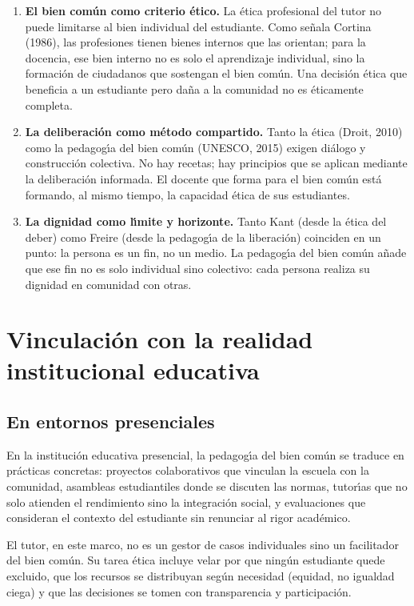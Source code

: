 \documentclass[12pt,letterpaper]{article}
\begin{document}
\begin{enumerate}
  \item \textbf{El bien com\'un como criterio \'etico.} La \'etica profesional del tutor no puede limitarse al bien individual del estudiante. Como se\~nala Cortina (1986), las profesiones tienen bienes internos que las orientan; para la docencia, ese bien interno no es solo el aprendizaje individual, sino la formaci\'on de ciudadanos que sostengan el bien com\'un. Una decisi\'on \'etica que beneficia a un estudiante pero da\~na a la comunidad no es \'eticamente completa.
  \item \textbf{La deliberaci\'on como m\'etodo compartido.} Tanto la \'etica (Droit, 2010) como la pedagog\'{\i}a del bien com\'un (UNESCO, 2015) exigen di\'alogo y construcci\'on colectiva. No hay recetas; hay principios que se aplican mediante la deliberaci\'on informada. El docente que forma para el bien com\'un est\'a formando, al mismo tiempo, la capacidad \'etica de sus estudiantes.
  \item \textbf{La dignidad como l\'{\i}mite y horizonte.} Tanto Kant (desde la \'etica del deber) como Freire (desde la pedagog\'{\i}a de la liberaci\'on) coinciden en un punto: la persona es un fin, no un medio. La pedagog\'{\i}a del bien com\'un a\~nade que ese fin no es solo individual sino colectivo: cada persona realiza su dignidad en comunidad con otras.
\end{enumerate}

\section{Vinculaci\'on con la realidad institucional educativa}

\subsection{En entornos presenciales}

En la instituci\'on educativa presencial, la pedagog\'{\i}a del bien com\'un se traduce en pr\'acticas concretas: proyectos colaborativos que vinculan la escuela con la comunidad, asambleas estudiantiles donde se discuten las normas, tutor\'{\i}as que no solo atienden el rendimiento sino la integraci\'on social, y evaluaciones que consideran el contexto del estudiante sin renunciar al rigor acad\'emico.

El tutor, en este marco, no es un gestor de casos individuales sino un facilitador del bien com\'un. Su tarea \'etica incluye velar por que ning\'un estudiante quede excluido, que los recursos se distribuyan seg\'un necesidad (equidad, no igualdad ciega) y que las decisiones se tomen con transparencia y participaci\'on.
\end{document}
